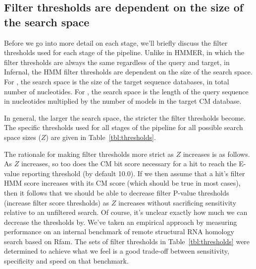 \subsection{Filter thresholds are dependent on the size of the search space}
Before we go into more detail on each stage, we'll briefly discuss the 
filter thresholds used for each stage of the pipeline. Unlike in
HMMER, in which the filter thresholds are always the same regardless of the query
and target, in Infernal, the HMM filter thresholds are dependent on
the size of the search space. For , the search space is
the size of the target sequence databases, in total number of
nucleotides. For , the search space is the length of the
query sequence in nucleotides multiplied by the number of models in
the target CM database. 

In general, the larger the search space, the stricter the filter
thresholds become. The specific thresholds used for all stages of the
pipeline for all possible search space sizes ($Z$) are given in
Table~\ref{tbl:thresholds}.

The rationale for making filter thresholds more strict as $Z$
increases is as follows. As $Z$ increases, so too does the CM bit
score necessary for a hit to reach the E-value reporting threshold (by
default 10.0). If we then assume that a hit's filter HMM score
increases with its CM score (which should be true in most cases), then
it follows that we should be able to decrease filter P-value
thresholds (increase filter score thresholds) as $Z$ increases without
sacrificing sensitivity relative to an unfiltered search. Of course,
it's unclear exactly how much we can decrease the thresholds by. We've
taken an empirical approach by measuring performance on an internal
benchmark of remote structural RNA homology search based on Rfam. The
sets of filter thresholds in Table~\ref{tbl:thresholds} were
determined to achieve what we feel is a good trade-off between
sensitivity, specificity and speed on that benchmark.

